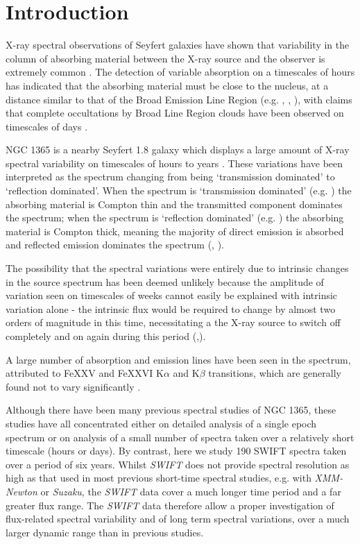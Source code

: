 \documentclass[useAMS,usenatbib]{sam}
\begin{document}
\section{Introduction}

X-ray spectral observations of Seyfert galaxies have shown that variability in the column of absorbing material between the X-ray source and the observer is extremely
common \citep{risaliti02}. The detection of variable absorption on a timescales of hours has indicated that the absorbing material must be close to the nucleus, at a
distance similar to that of the Broad Emission Line Region  (e.g. \citet{lamer}, \citet{elvis04}, \citet{puccetti}), with claims that complete occultations by Broad Line
Region clouds have been observed on timescales of days \citep{risaliti07a}.


NGC 1365 is a nearby Seyfert 1.8 galaxy \citep{maiolino95} which displays a large amount of X-ray spectral variability \citep{risaliti09} on timescales of hours
to years \citep{brenneman}. These variations have been interpreted as the spectrum changing from being `transmission dominated' to `reflection
dominated'. When the spectrum is `transmission dominated' (e.g. \citet{risaliti00}) the absorbing material is Compton thin and the transmitted component dominates the
spectrum; when the spectrum is `reflection dominated' (e.g. \citet{iyomoyo}) the absorbing material is Compton thick, meaning the majority of direct emission is absorbed
and reflected emission dominates the spectrum (\citet{risaliti07b}, \citet{matt}). 

The possibility that the spectral variations were entirely due to intrinsic changes in the source spectrum has been deemed unlikely because the amplitude of variation
seen on timescales of weeks cannot easily be explained with intrinsic variation alone - the intrinsic flux would be required to change by almost two orders of magnitude
in this time, necessitating a the X-ray source to switch off completely and on again during this period (\citet{risaliti07b},\citet{risaliti05b}). 

A large number of absorption and emission lines have been seen in the spectrum, attributed to FeXXV and FeXXVI K$\alpha$ and K$\beta$ transitions, which are generally
found not to vary significantly \citep{risaliti05b}.

Although there have been many previous spectral studies of NGC 1365, these studies have all concentrated either on detailed analysis of a single epoch spectrum or on
analysis of a small number of spectra taken over a relatively short timescale (hours or days). By contrast, here we study 190 SWIFT spectra taken over a period of six
years. Whilst {\it SWIFT} does not provide spectral resolution as high as that used in most previous short-time spectral studies, e.g. with {\it XMM-Newton} or {\it
Suzaku}, the {\it SWIFT} data cover a much longer time period and a far greater flux range. The {\it SWIFT} data therefore allow a proper investigation of flux-related
spectral variability and of long term spectral variations, over a much larger dynamic range than in previous studies.
\end{document}
